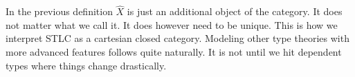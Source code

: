 In the previous definition $\hat{X}$ is just an additional object of
the category.  It does not matter what we call it.  It does however
need to be unique.  This is how we interpret STLC as a cartesian
closed category.  Modeling other type theories with more advanced
features follows quite naturally.  It is not until we hit dependent
types where things change drastically.
